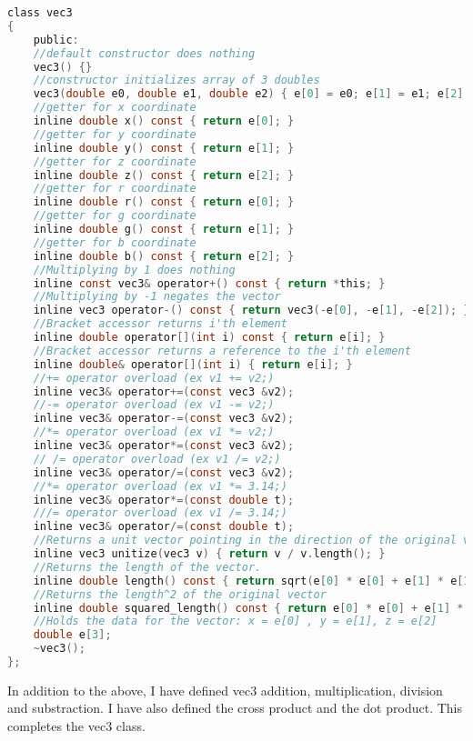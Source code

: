 \documentclass[11pt]{article}
\renewcommand{\>}{\rightarrow}
\numberwithin{equation}{section}
\begin{document}
\vspace{.2in}
\noindent
\begin{lstlisting}[language=C, caption=vec3 Class]
class vec3
{
	public:
	//default constructor does nothing
	vec3() {}
	//constructor initializes array of 3 doubles
	vec3(double e0, double e1, double e2) { e[0] = e0; e[1] = e1; e[2] = e2; }
	//getter for x coordinate
	inline double x() const { return e[0]; }
	//getter for y coordinate
	inline double y() const { return e[1]; }
	//getter for z coordinate
	inline double z() const { return e[2]; }
	//getter for r coordinate
	inline double r() const { return e[0]; }
	//getter for g coordinate
	inline double g() const { return e[1]; }
	//getter for b coordinate
	inline double b() const { return e[2]; }
	//Multiplying by 1 does nothing
	inline const vec3& operator+() const { return *this; }
	//Multiplying by -1 negates the vector
	inline vec3 operator-() const { return vec3(-e[0], -e[1], -e[2]); }
	//Bracket accessor returns i'th element
	inline double operator[](int i) const { return e[i]; }
	//Bracket accessor returns a reference to the i'th element
	inline double& operator[](int i) { return e[i]; }
	//+= operator overload (ex v1 += v2;)
	inline vec3& operator+=(const vec3 &v2);
	//-= operator overload (ex v1 -= v2;)
	inline vec3& operator-=(const vec3 &v2);
	//*= operator overload (ex v1 *= v2;)
	inline vec3& operator*=(const vec3 &v2);
	// /= operator overload (ex v1 /= v2;)
	inline vec3& operator/=(const vec3 &v2);
	//*= operator overload (ex v1 *= 3.14;)
	inline vec3& operator*=(const double t);
	///= operator overload (ex v1 /= 3.14;)
	inline vec3& operator/=(const double t);
	//Returns a unit vector pointing in the direction of the original vector.
	inline vec3 unitize(vec3 v) { return v / v.length(); }
	//Returns the length of the vector.
	inline double length() const { return sqrt(e[0] * e[0] + e[1] * e[1] + e[2] * e[2]); }
	//Returns the length^2 of the original vector
	inline double squared_length() const { return e[0] * e[0] + e[1] * e[1] + e[2] * e[2]; }
	//Holds the data for the vector: x = e[0] , y = e[1], z = e[2]
	double e[3];
	~vec3();
};
\end{lstlisting}
\vspace{.2in}
\noindent
In addition to the above, I have defined vec3 addition, multiplication, division and substraction. I have also defined the cross product and the dot product. This completes the vec3 class.
\end{document}
